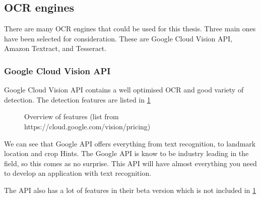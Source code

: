 \subsection{OCR engines}\label{subsec:ocr-engines}
There are many OCR engines that could be used for this thesis.
Three main ones have been selected for consideration.
These are Google Cloud Vision API, Amazon Textract, and Tesseract.
\subsubsection{Google Cloud Vision API}\label{subsubsec:API_Google}

Google Cloud Vision API contains a well optimised OCR and good variety of detection.
The detection features are listed in \ref{fig:Google cloud API prices}

\begin{figure}[h]
    \caption{Overview of features (list from https://cloud.google.com/vision/pricing)}
    \label{fig:Google cloud API prices}

\end{figure}

We can see that Google API offers everything from text recognition, to landmark location and crop Hints.
The Google API is know to be industry leading in the field, so this comes as no surprise.
This API will have almost everything you need to develop an application with text recognition.

The API also has a lot of features in their beta version which is not included in \ref{fig:Google cloud API prices}
\clearpage

